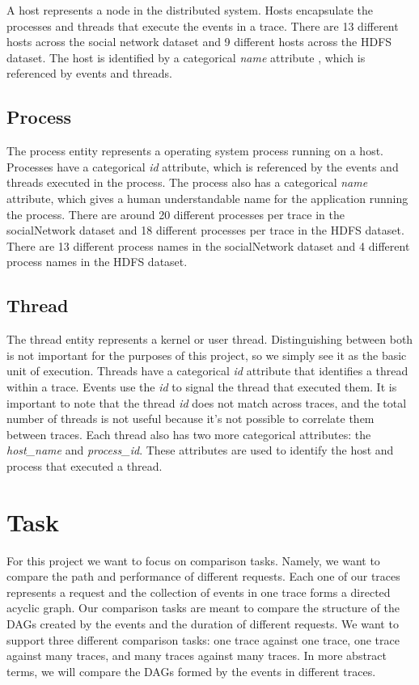 \documentclass{article}
\begin{document}
A host represents a node in the distributed system. Hosts encapsulate the processes and threads
that execute the events in a trace. There are 13 different hosts across the social network dataset
and 9 different hosts across the HDFS dataset. The host is identified by a categorical \textit{name} attribute , which is
referenced by events and threads.

\subsection{Process}

The process entity represents a operating system process running on
a host. Processes have a categorical \textit{id} attribute, which is referenced by the events and threads executed in
the process. The process also has a categorical \textit{name} attribute, which gives a human understandable name for the
application running the process. There are around 20 different processes per trace in the socialNetwork
dataset and 18 different processes per trace in the HDFS dataset. There are 13 different process names
in the socialNetwork dataset and 4 different process names in the HDFS dataset.

\subsection{Thread}

The thread entity represents
a kernel or user thread. Distinguishing between both is not important for the purposes of this project, so we
simply see it as the basic unit of execution. Threads have a categorical \textit{id} attribute that identifies a thread
within a trace. Events use the \textit{id} to signal the thread that executed them. It is important to note
that the thread \textit{id} does not match across traces, and the total number of threads is not useful because it's
not possible to correlate them between traces. Each thread also has two more categorical attributes: the \textit{host\_name}
and \textit{process\_id}. These attributes are used to identify the host and process that executed a thread. 

\section{Task}

For this project we want to focus on comparison tasks. Namely, we want to compare the path and performance of different
requests. Each one of our traces represents a request and the collection of events in one trace forms a directed acyclic graph. Our
comparison tasks are meant to compare the structure of the DAGs created by the events and the duration of different requests. 
We want to support three different comparison tasks: one trace against one trace, one trace against many traces, and many traces
against many traces. In more abstract terms, we will compare the DAGs formed by the events in different traces.  
\end{document}
